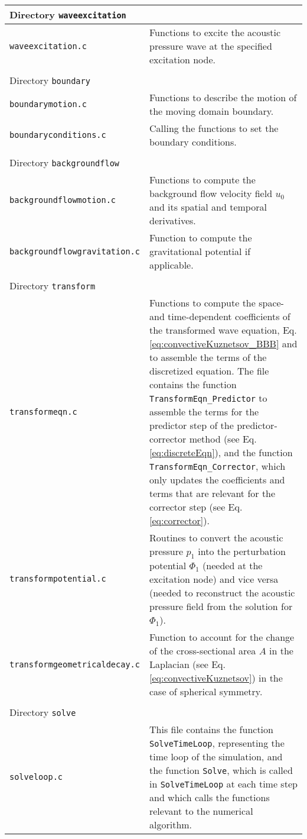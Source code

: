 \begin{longtable}{p{} p{}}
\\
\hline Directory {\tt waveexcitation} &\\ \hline
{\tt waveexcitation.c} & Functions to excite the acoustic pressure wave at the specified excitation node. \\
\\
\hline Directory {\tt boundary} &\\ \hline
{\tt boundarymotion.c} & Functions to describe the motion of the moving domain boundary. \\
{\tt boundaryconditions.c} & Calling the functions to set the boundary conditions. \\
\\
\hline Directory {\tt backgroundflow} &\\ \hline
{\tt backgroundflowmotion.c} & Functions to compute the background flow velocity field $u_0$ and its spatial and temporal derivatives. \\
{\tt backgroundflowgravitation.c} & Function to compute the gravitational potential if applicable. \\
\\
\hline Directory {\tt transform} &\\ \hline
{\tt transformeqn.c} & Functions to compute the space- and time-dependent coefficients of the transformed wave equation, Eq. \eqref{eq:convectiveKuznetsov_BBB}  and to assemble the terms of the discretized equation. The file contains the function {\tt TransformEqn\_Predictor} to assemble the terms for the predictor step of the predictor-corrector method (see Eq. \eqref{eq:discreteEqn}), and the function {\tt TransformEqn\_Corrector}, which only updates the coefficients and terms that are relevant for the corrector step (see Eq. \eqref{eq:corrector}).\\
{\tt transformpotential.c} & Routines to convert the acoustic pressure $p_1$ into the perturbation potential $\Phi_1$ (needed at the excitation node) and vice versa (needed to reconstruct the acoustic pressure field from the solution for $\Phi_1$). \\
{\tt transformgeometricaldecay.c} & Function to account for the change of the cross-sectional area $A$ in the Laplacian (see Eq. \eqref{eq:convectiveKuznetsov}) in the case of spherical symmetry. \\
\\
\hline Directory {\tt solve} &\\ \hline
{\tt solveloop.c} & This file contains the function {\tt SolveTimeLoop}, representing the time loop of the simulation, and the function {\tt Solve}, which is called in {\tt {\tt SolveTimeLoop}} at each time step and which calls the functions relevant to the numerical algorithm. \\

\end{longtable}
